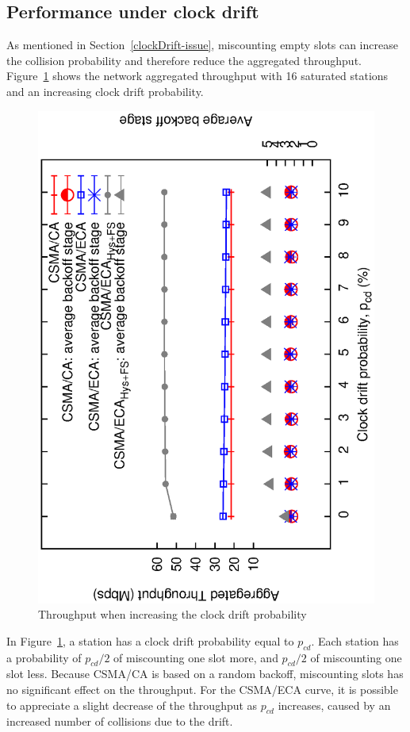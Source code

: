 \documentclass[a4paper,journal]{IEEEtran}
\begin{document}
	\subsection{Performance under clock drift}
	As mentioned in Section~\ref{clockDrift-issue}, miscounting empty slots can increase the collision probability and therefore reduce the aggregated throughput. Figure~\ref{fig:clockDrift} shows the network aggregated throughput with 16 saturated stations and an increasing clock drift probability.
	
	\begin{figure}[htbp]
	\centering
		\includegraphics[width=0.7\linewidth,angle=-90]{figures/clockDrift/throughput_and_BOS_w_SD.eps}
		\caption{Throughput when increasing the clock drift probability}
		\label{fig:clockDrift}
	\end{figure}
	
	In Figure~\ref{fig:clockDrift}, a station has a clock drift probability equal to $p_{cd}$. Each station has a probability of $p_{cd}/2$ of miscounting one slot more, and $p_{cd}/2$ of miscounting one slot less. Because CSMA/CA is based on a random backoff, miscounting slots has no significant effect on the throughput. For the CSMA/ECA curve, it is possible to appreciate a slight decrease of the throughput as $p_{cd}$ increases, caused by an increased number of collisions due to the drift.
	
\end{document}
